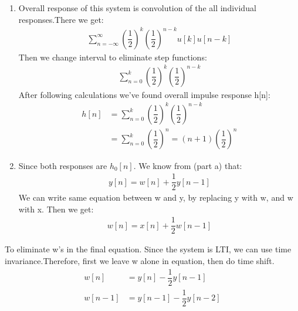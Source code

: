 \documentclass[10pt,a4paper, margin=1in]{article}
\begin{document}
\begin{enumerate}
\begin{enumerate}
    \item %
    Overall response of this system is convolution of the all individual responses.There we get:
    \begin{equation}
	\begin{split}
    \sum_{n=-\infty}^{\infty} (\dfrac{1}{2})^k  (\dfrac{1}{2})^{n-k} u[k]u[n-k]
	\end{split}
	\end{equation}
	Then we change interval to eliminate step functions:
	\begin{equation}
	\begin{split}
    \sum_{n=0}^{k} (\dfrac{1}{2})^k  (\dfrac{1}{2})^{n-k}
	\end{split}
	\end{equation}
	After following calculations we've found overall impulse response h[n]:
	\begin{equation}
	\begin{split}
    h[n] &= \sum_{n=0}^{k} (\dfrac{1}{2})^k  (\dfrac{1}{2})^{n-k} \\
    &= \sum_{n=0}^{k} (\dfrac{1}{2})^n = (n+1)(\dfrac{1}{2})^n
	\end{split}
	\end{equation}
    \item %
    Since both responses are $h_0[n]$. We know from (part a) that: \\
    \begin{equation}
	\begin{split}
	 y[n] = w[n] + \dfrac{1}{2}y[n-1]
	\end{split}
	\end{equation}
	We can write same equation between w and y, by replacing y with w, and w with x. Then we get: \\
	\begin{equation}
	\begin{split}
	 w[n] = x[n] + \dfrac{1}{2}w[n-1]
	\end{split}
	\end{equation}
    \end{enumerate}
    To eliminate w's in the final equation. Since the system is LTI, we can use time invariance.Therefore, first we leave w alone in equation, then do time shift. \\
    \begin{equation}
	\begin{split}
	 w[n] &= y[n] - \dfrac{1}{2}y[n-1] \\
	 w[n-1] &= y[n-1] - \dfrac{1}{2}y[n-2] \\

\end{split}
\end{equation}
\end{enumerate}
\end{document}
